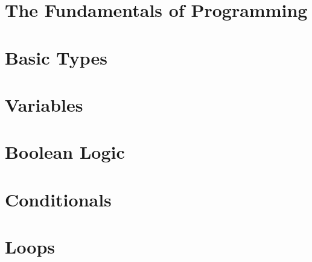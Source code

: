 \documentclass[b5paper,openany]{book}
\begin{document}
\tp



\tableofcontents



\chapter{The Fundamentals of Programming}


\chapter{Basic Types}


\chapter{Variables}


\chapter{Boolean Logic}


\chapter{Conditionals}


\chapter{Loops}







\end{document}
